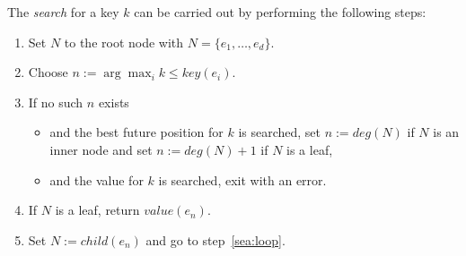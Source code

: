 \documentclass{vldb}
\begin{document}
\begin{proc} \label{sea}
The {\em search} for a key $k$ can be carried out by performing the following
steps:
\begin{enumerate}
\item Set $N$ to the root node with \mbox{$N = \{e_1, \ldots, e_d\}$}.
\item \label{sea:loop} Choose \mbox{$n := \arg \max_{i} k \leq key(e_i)$}.
\item If no such $n$ exists
    \begin{itemize}
    \item and the best future position for $k$ is searched,
        set \mbox{$n := deg(N)$} if $N$ is an inner node and
        set \mbox{$n := deg(N) + 1$} if $N$ is a leaf,
    \item and the value for $k$ is searched, exit with an error.
    \end{itemize}
\item If $N$ is a leaf, return $value(e_n)$.
\item Set \mbox{$N := child(e_n)$} and go to step~\ref{sea:loop}.
\end{enumerate}
\end{proc}
\end{document}
